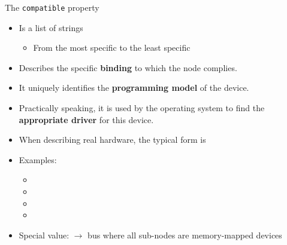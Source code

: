 \begin{frame}{The {\tt compatible} property}
  \begin{itemize}
  \item Is a list of strings
    \begin{itemize}
    \item From the most specific to the least specific
    \end{itemize}
  \item Describes the specific {\bf binding} to which the node complies.
  \item It uniquely identifies the {\bf programming model} of the
    device.
  \item Practically speaking, it is used by the operating system to
    find the {\bf appropriate driver} for this device.
  \item When describing real hardware, the typical form is
  \item Examples:
    \begin{itemize}
    \item {}
    \item {}
    \item {}
    \item {}
    \end{itemize}
  \item Special value:  $\rightarrow$ bus where all
    sub-nodes are memory-mapped devices
  \end{itemize}
\end{frame}

